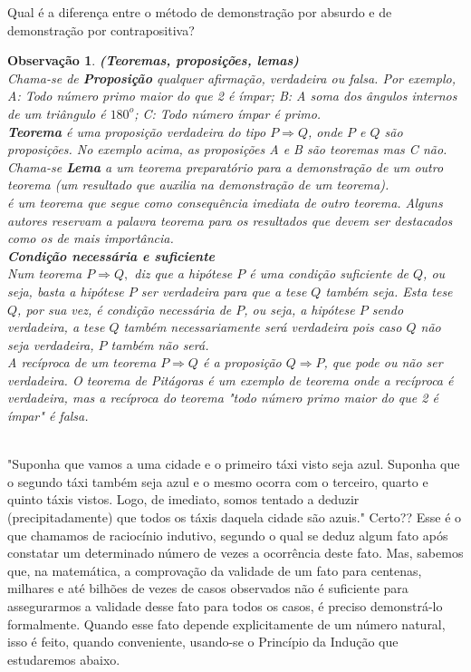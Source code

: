 \documentclass[10pt]{article}
\newtheorem{obs}{Observação}
\begin{document}
\noindent Qual é a diferença entre o método de demonstração por absurdo e de demonstração por contrapositiva?
\begin{obs}{\bf(Teoremas, proposições, lemas)}\\
Chama-se de {\bf Proposição} qualquer afirmação, verdadeira ou falsa. Por exemplo, A: Todo número primo maior do que 2 é ímpar; B: A soma dos ângulos internos de um triângulo é $180^{o}$; C: Todo número ímpar é primo.\\
{\bf Teorema} é uma proposição verdadeira do tipo $P\Rightarrow Q$, onde $P$ e $Q$ são proposições. No exemplo acima, as proposições A e B são teoremas mas C não.\\
Chama-se {\bf Lema} a um teorema preparatório para a demonstração de um outro teorema (um resultado que auxilia na demonstração de um teorema). \\
 é um teorema que segue como consequência imediata de outro teorema. Alguns autores reservam a palavra teorema para os resultados que devem ser destacados como os de mais importância.\\
{\bf Condição necessária e suficiente}\\
Num teorema $P\Rightarrow Q,$ diz que a hipótese $P$ é uma condição suficiente de $Q$, ou seja, basta a hipótese $P$ ser verdadeira para que a tese $Q$ também seja. Esta tese $Q$, por sua vez, é condição necessária de $P$, ou seja, a hipótese $P$ sendo verdadeira, a tese $Q$ também necessariamente será verdadeira pois caso $Q$ não seja verdadeira, $P$ também não será.\\
A recíproca de um teorema $P\Rightarrow Q$ é a proposição $Q\Rightarrow P$, que pode ou não ser verdadeira. O teorema de Pitágoras  é um exemplo de teorema onde a recíproca é verdadeira, mas a recíproca do teorema "todo número primo maior do que 2 é ímpar" é falsa.\\
\end{obs}
\\

"Suponha que vamos a uma cidade e o primeiro táxi visto seja azul. Suponha que o segundo táxi também seja azul e o mesmo ocorra com o terceiro, quarto e quinto táxis vistos. Logo, de imediato, somos tentado a deduzir (precipitadamente) que todos os táxis daquela cidade são azuis." Certo??
Esse é o que chamamos de raciocínio indutivo, segundo o qual se deduz algum fato após constatar um determinado número de vezes a ocorrência deste fato. Mas, sabemos que, na matemática, a comprovação da validade de um fato para centenas, milhares e até bilhões de vezes de casos observados não é suficiente para assegurarmos a validade desse fato para todos os casos, é preciso demonstrá-lo formalmente. Quando esse fato depende explicitamente de um número natural, isso é feito, quando conveniente, usando-se o Princípio da Indução que estudaremos abaixo.
\end{document}
